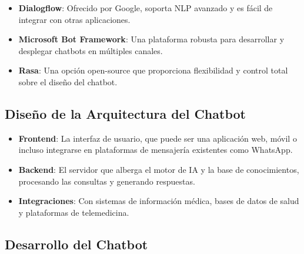 \begin{itemize}
    \item \textbf{Dialogflow}: Ofrecido por Google, soporta NLP avanzado y es fácil de integrar con otras aplicaciones.
    \item \textbf{Microsoft Bot Framework}: Una plataforma robusta para desarrollar y desplegar chatbots en múltiples canales.
    \item \textbf{Rasa}: Una opción open-source que proporciona flexibilidad y control total sobre el diseño del chatbot.
\end{itemize}

\subsection{Diseño de la Arquitectura del Chatbot}

\begin{itemize}
    \item \textbf{Frontend}: La interfaz de usuario, que puede ser una aplicación web, móvil o incluso integrarse en plataformas de mensajería existentes como WhatsApp.
    \item \textbf{Backend}: El servidor que alberga el motor de IA y la base de conocimientos, procesando las consultas y generando respuestas.
    \item \textbf{Integraciones}: Con sistemas de información médica, bases de datos de salud y plataformas de telemedicina.
\end{itemize}

\subsection{Desarrollo del Chatbot}


